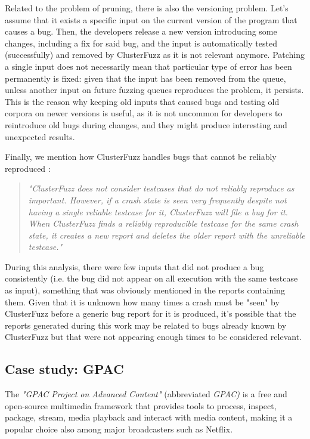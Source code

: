 Related to the problem of pruning, there is also the versioning problem.
Let's assume that it exists a specific input on the current version of the program that causes a bug. Then, the developers release a new version introducing some changes, including a fix for said bug, and the input is automatically tested (successfully) and removed by ClusterFuzz as it is not relevant anymore. Patching a single input does not necessarily mean that particular type of error has been permanently is fixed: given that the input has been removed from the queue, unless another input on future fuzzing queues reproduces the problem, it persists. This is the reason why keeping old inputs that caused bugs and testing old corpora on newer versions is useful, as it is not uncommon for developers to reintroduce old bugs during changes, and they might produce interesting and unexpected results.

\newpage
Finally, we mention how ClusterFuzz handles bugs that cannot be reliably reproduced \cite{unreliable}: 
\blockquote{\textit{"ClusterFuzz does not consider testcases that do not reliably reproduce as important. However, if a crash state is seen very frequently despite not having a single reliable testcase for it, ClusterFuzz will file a bug for it. When ClusterFuzz finds a reliably reproducible testcase for the same crash state, it creates a new report and deletes the older report with the unreliable testcase."}}
During this analysis, there were few inputs that did not produce a bug consistently (i.e. the bug did not appear on all execution with the same testcase as input), something that was obviously mentioned in the reports containing them. Given that it is unknown how many times a crash must be "seen" by ClusterFuzz before a generic bug report for it is produced, it's possible that the reports generated during this work may be related to bugs already known by ClusterFuzz but that were not appearing enough times to be considered relevant.


\newpage
\subsection{Case study: GPAC}
The \textit{"GPAC Project on Advanced Content"} (abbreviated \textit{GPAC)} \cite{gpac} is a free and open-source multimedia framework that provides tools to process, inspect, package, stream, media playback and interact with media content, making it a popular choice also among major broadcasters such as Netflix.

